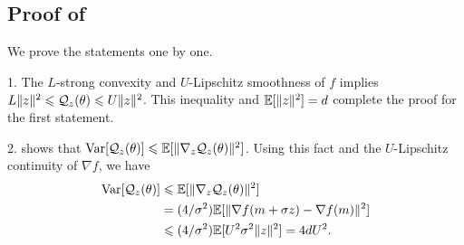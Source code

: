 \documentclass[journal]{IEEEtran}
\DeclareMathOperator{\Var}{Var}   %
\providecommand{\E}{\mathbb{E}} %
\renewcommand{\leq}{\leqslant} %
\DeclarePairedDelimiter{\norm}{\lVert}{\rVert}
\theoremstyle{definition}
\begin{document}
\subsection{Proof of }\label{apdx:lemma:variance}


We prove the statements one by one.

1. The $L$-strong convexity and $U$-Lipschitz smoothness of $f$ implies 
$L \norm{z}^2 \leq \mathcal{Q}_z(\theta) \leq U \norm{z}^2$.
This inequality and $\E[\norm{z}^2] = d$ complete the proof for the first statement.

2. \cite[Therem2]{chen1982inequality}
shows that
$\Var[\mathcal{Q}_z(\theta)] \leq \E[ \norm{\nabla_z \mathcal{Q}_z(\theta)}^2 ]$.
Using this fact and the $U$-Lipschitz continuity of $\nabla f$, we have
\begin{equation}
\begin{split}
\Var[\mathcal{Q}_z(\theta)] 
&\leq \E[ \norm{\nabla_z \mathcal{Q}_z(\theta)}^2 ] \\
&= 
(4 / \sigma^2) 
\E[ \norm{ \nabla f(m + \sigma z) - \nabla f(m) }^2 ] 
\\
&\leq 
(4 / \sigma^2) 
\E[ U^2 \sigma^2 \norm{ z }^2 ] 
= 4 d U^2 .
\end{split}
\end{equation}
\end{document}
